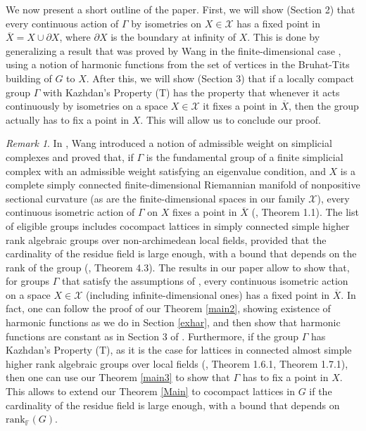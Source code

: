 \documentclass{article}
\theoremstyle{definition}
\theoremstyle{remark}
\newtheorem{rmk}[dfn]{Remark}
\theoremstyle{plain}
\begin{document}
We now present a short outline of the paper. First, we will show (Section 2) that every continuous action of $\Gamma$ by isometries on $X\in\mathcal{X}$ has a fixed point in $\overline{X}=X\cup\partial X$, where $\partial X$ is the boundary at infinity of $X$. This is done by generalizing a result that was proved by Wang in the finite-dimensional case \cite{wang}, using a notion of harmonic functions from the set of vertices in the Bruhat-Tits building of $G$ to $X$. After this, we will show (Section 3) that if a locally compact group $\Gamma$ with Kazhdan's Property (T) has the property that whenever it acts continuously by isometries on a space $X\in\mathcal{X}$ it fixes a point in $\overline{X}$, then the group actually has to fix a point in $X$. This will allow us to conclude our proof. \\

\begin{rmk}
    In \cite{wang}, Wang introduced a notion of admissible weight on simplicial complexes and proved that, if $\Gamma$ is the fundamental group of a finite simplicial complex with an admissible weight satisfying an eigenvalue condition, and $X$ is a complete simply connected finite-dimensional Riemannian manifold of nonpositive sectional curvature (as are the finite-dimensional spaces in our family $\mathcal{X}$), every continuous isometric action of $\Gamma$ on $X$ fixes a point in $\overline{X}$ (\cite{wang}, Theorem 1.1). The list of eligible groups includes cocompact lattices in simply connected simple higher rank algebraic groups over non-archimedean local fields, provided that the cardinality of the residue field is large enough, with a bound that depends on the rank of the group (\cite{wang}, Theorem 4.3). The results in our paper allow to show that, for groups $\Gamma$ that satisfy the assumptions of \cite{wang}, every continuous isometric action on a space $X\in\mathcal{X}$ (including infinite-dimensional ones) has a fixed point in $\overline{X}$. In fact, one can follow the proof of our Theorem \ref{main2}, showing existence of harmonic functions as we do in Section \ref{exhar}, and then show that harmonic functions are constant as in Section 3 of \cite{wang}. Furthermore, if the group $\Gamma$ has Kazhdan's Property (T), as it is the case for lattices in connected almost simple higher rank algebraic groups over local fields (\cite{kazhdanT}, Theorem 1.6.1, Theorem 1.7.1), then one can use our Theorem \ref{main3} to show that $\Gamma$ has to fix a point in $X$. This allows to extend our Theorem \ref{Main} to cocompact lattices in $G$ if the cardinality of the residue field is large enough, with a bound that depends on $\mathrm{rank}_\mathbb{F}(G)$. \\
    \end{rmk}
\end{document}
